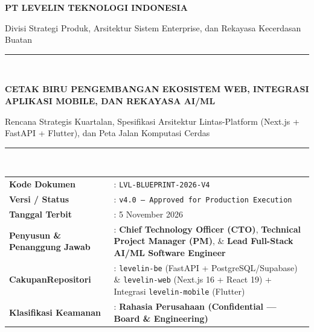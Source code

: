 \documentclass[11pt,a4paper]{report}
\begin{document}
\begin{titlepage}
    \centering
    \vspace*{0.8cm}
    {\scshape\Large\color{LevelinAccent}\textbf{PT LEVELIN TEKNOLOGI INDONESIA}\par}
    \vspace{0.2cm}
    {\small\color{LevelinMuted}Divisi Strategi Produk, Arsitektur Sistem Enterprise, dan Rekayasa Kecerdasan Buatan\par}
    \vspace{1.2cm}
    \rule{\textwidth}{1.5pt}\\[0.5cm]
    {\Huge\bfseries\color{LevelinPrimary} CETAK BIRU PENGEMBANGAN EKOSISTEM WEB, INTEGRASI APLIKASI MOBILE, DAN REKAYASA AI/ML\par}
    \vspace{0.4cm}
    {\Large\color{LevelinMuted} Rencana Strategis Kuartalan, Spesifikasi Arsitektur Lintas-Platform (Next.js + FastAPI + Flutter), dan Peta Jalan Komputasi Cerdas\par}
    \vspace{0.3cm}
    \rule{\textwidth}{1.5pt}\\[1.2cm]

    \begin{tcolorbox}[colback=LevelinLight,colframe=LevelinBorder,width=0.94\textwidth,arc=2mm,boxrule=0.6pt]
        \small
        \renewcommand{\arraystretch}{1.35}
        \begin{tabularx}{\textwidth}{L{4.5cm} X}
            \textbf{Kode Dokumen} & : \texttt{LVL-BLUEPRINT-2026-V4} \\
            \textbf{Versi / Status} & : \texttt{v4.0 --- Approved for Production Execution} \\
            \textbf{Tanggal Terbit} & : 5 November 2026 \\
            \textbf{Penyusun \& Penanggung Jawab} & : \textbf{Chief Technology Officer (CTO)}, \textbf{Technical Project Manager (PM)}, \& \textbf{Lead Full-Stack AI/ML Software Engineer} \\
            \textbf{CakupanRepositori} & : \texttt{levelin-be} (FastAPI + PostgreSQL/Supabase) \& \texttt{levelin-web} (Next.js 16 + React 19) + Integrasi \texttt{levelin-mobile} (Flutter) \\
            \textbf{Klasifikasi Keamanan} & : \textbf{Rahasia Perusahaan (Confidential --- Board \& Engineering)} \\
        \end{tabularx}
    \end{tcolorbox}


\end{titlepage}
\end{document}
